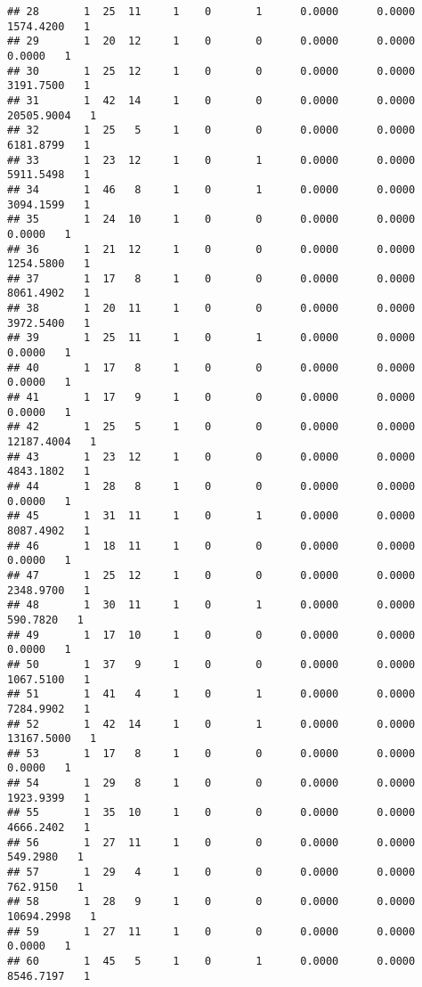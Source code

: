 \documentclass[
]{article}
\begin{document}
\begin{enumerate}
\begin{verbatim}
## 28       1  25  11     1    0       1      0.0000      0.0000   1574.4200   1
## 29       1  20  12     1    0       0      0.0000      0.0000      0.0000   1
## 30       1  25  12     1    0       0      0.0000      0.0000   3191.7500   1
## 31       1  42  14     1    0       0      0.0000      0.0000  20505.9004   1
## 32       1  25   5     1    0       0      0.0000      0.0000   6181.8799   1
## 33       1  23  12     1    0       1      0.0000      0.0000   5911.5498   1
## 34       1  46   8     1    0       1      0.0000      0.0000   3094.1599   1
## 35       1  24  10     1    0       0      0.0000      0.0000      0.0000   1
## 36       1  21  12     1    0       0      0.0000      0.0000   1254.5800   1
## 37       1  17   8     1    0       0      0.0000      0.0000   8061.4902   1
## 38       1  20  11     1    0       0      0.0000      0.0000   3972.5400   1
## 39       1  25  11     1    0       1      0.0000      0.0000      0.0000   1
## 40       1  17   8     1    0       0      0.0000      0.0000      0.0000   1
## 41       1  17   9     1    0       0      0.0000      0.0000      0.0000   1
## 42       1  25   5     1    0       0      0.0000      0.0000  12187.4004   1
## 43       1  23  12     1    0       0      0.0000      0.0000   4843.1802   1
## 44       1  28   8     1    0       0      0.0000      0.0000      0.0000   1
## 45       1  31  11     1    0       1      0.0000      0.0000   8087.4902   1
## 46       1  18  11     1    0       0      0.0000      0.0000      0.0000   1
## 47       1  25  12     1    0       0      0.0000      0.0000   2348.9700   1
## 48       1  30  11     1    0       1      0.0000      0.0000    590.7820   1
## 49       1  17  10     1    0       0      0.0000      0.0000      0.0000   1
## 50       1  37   9     1    0       0      0.0000      0.0000   1067.5100   1
## 51       1  41   4     1    0       1      0.0000      0.0000   7284.9902   1
## 52       1  42  14     1    0       1      0.0000      0.0000  13167.5000   1
## 53       1  17   8     1    0       0      0.0000      0.0000      0.0000   1
## 54       1  29   8     1    0       0      0.0000      0.0000   1923.9399   1
## 55       1  35  10     1    0       0      0.0000      0.0000   4666.2402   1
## 56       1  27  11     1    0       0      0.0000      0.0000    549.2980   1
## 57       1  29   4     1    0       0      0.0000      0.0000    762.9150   1
## 58       1  28   9     1    0       0      0.0000      0.0000  10694.2998   1
## 59       1  27  11     1    0       0      0.0000      0.0000      0.0000   1
## 60       1  45   5     1    0       1      0.0000      0.0000   8546.7197   1

\end{verbatim}
\end{enumerate}
\end{document}
